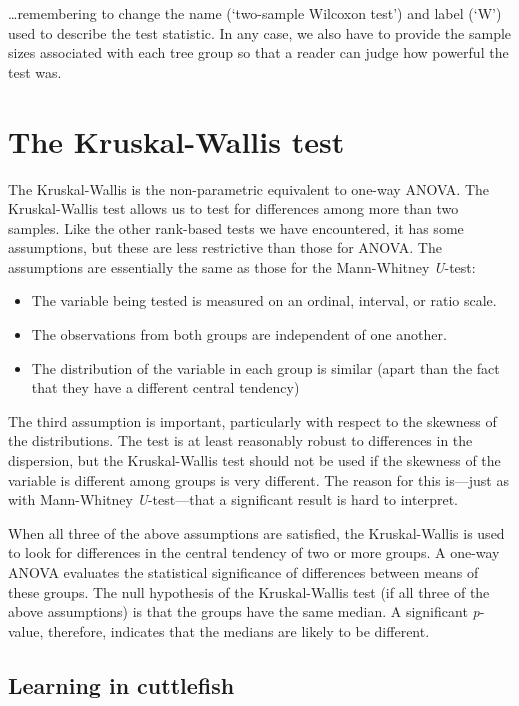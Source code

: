\documentclass[
]{book}
\begin{document}
\ldots remembering to change the name (`two-sample Wilcoxon test') and label (`W') used to describe the test statistic. In any case, we also have to provide the sample sizes associated with each tree group so that a reader can judge how powerful the test was.

\hypertarget{the-kruskal-wallis-test}{%
\section{The Kruskal-Wallis test}\label{the-kruskal-wallis-test}}

The Kruskal-Wallis is the non-parametric equivalent to one-way ANOVA. The Kruskal-Wallis test allows us to test for differences among more than two samples. Like the other rank-based tests we have encountered, it has some assumptions, but these are less restrictive than those for ANOVA. The assumptions are essentially the same as those for the Mann-Whitney \emph{U}-test:

\begin{itemize}
\item
  The variable being tested is measured on an ordinal, interval, or ratio scale.
\item
  The observations from both groups are independent of one another.
\item
  The distribution of the variable in each group is similar (apart than the fact that they have a different central tendency)
\end{itemize}

The third assumption is important, particularly with respect to the skewness of the distributions. The test is at least reasonably robust to differences in the dispersion, but the Kruskal-Wallis test should not be used if the skewness of the variable is different among groups is very different. The reason for this is---just as with Mann-Whitney \emph{U}-test---that a significant result is hard to interpret.

When all three of the above assumptions are satisfied, the Kruskal-Wallis is used to look for differences in the central tendency of two or more groups. A one-way ANOVA evaluates the statistical significance of differences between means of these groups. The null hypothesis of the Kruskal-Wallis test (if all three of the above assumptions) is that the groups have the same median. A significant \emph{p}-value, therefore, indicates that the medians are likely to be different.

\hypertarget{learning-in-cuttlefish}{%
\subsection{Learning in cuttlefish}\label{learning-in-cuttlefish}}
\end{document}
